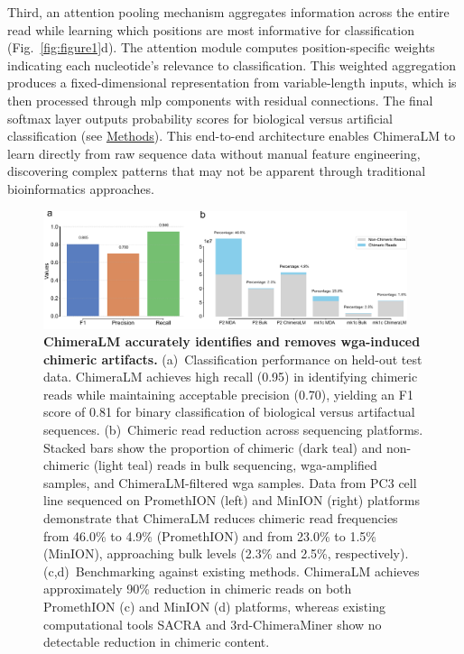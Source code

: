 \documentclass[pdflatex,sn-nature,lineno]{sn-jnl}%
\theoremstyle{thmstyleone}%
\theoremstyle{thmstyletwo}%
\theoremstyle{thmstylethree}%
\begin{document}
Third, an attention pooling mechanism aggregates information across the entire read while learning which positions are most informative for classification (Fig.~\ref{fig:figure1}d).
The attention module computes position-specific weights indicating each nucleotide's relevance to classification.
This weighted aggregation produces a fixed-dimensional representation from variable-length inputs, which is then processed through \gls{mlp} components with residual connections.
The final softmax layer outputs probability scores for biological versus artificial classification (see \hyperref[sec:methods]{Methods}).
This end-to-end architecture enables ChimeraLM to learn directly from raw sequence data without manual feature engineering, discovering complex patterns that may not be apparent through traditional bioinformatics approaches.

\begin{figure}[!ht]
	\begin{center}
		\includegraphics[width=0.95\textwidth]{final_figures/figure2}
	\end{center}
    \caption{{\bf ChimeraLM accurately identifies and removes \gls{wga}-induced chimeric artifacts.}
	(a)~Classification performance on held-out test data.
    ChimeraLM achieves high recall (0.95) in identifying chimeric reads while maintaining acceptable precision (0.70), yielding an F1 score of 0.81 for binary classification of biological versus artifactual sequences.
	(b)~Chimeric read reduction across sequencing platforms.
    Stacked bars show the proportion of chimeric (dark teal) and non-chimeric (light teal) reads in bulk sequencing, \gls{wga}-amplified samples, and ChimeraLM-filtered \gls{wga} samples.
    Data from PC3 cell line sequenced on PromethION (left) and MinION (right) platforms demonstrate that ChimeraLM reduces chimeric read frequencies from 46.0\% to 4.9\% (PromethION) and from 23.0\% to 1.5\% (MinION), approaching bulk levels (2.3\% and 2.5\%, respectively).
	(c,d)~Benchmarking against existing methods.
    ChimeraLM achieves approximately 90\% reduction in chimeric reads on both PromethION (c) and MinION (d) platforms, whereas existing computational tools SACRA and 3rd-ChimeraMiner show no detectable reduction in chimeric content.}\label{fig:figure2}
\end{figure}
\end{document}
